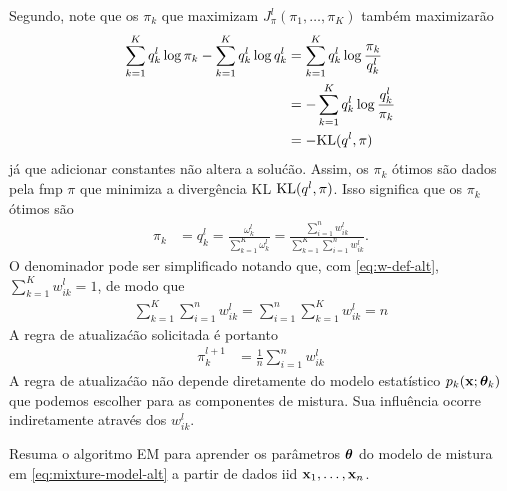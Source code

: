 \begin{exenumerate}
\begin{solution}
        Segundo, note que os $\pi_k$ que maximizam $J_\pi^l(\pi_1, \ldots,
        \pi_K)$ tamb\'em maximizar\~ao
        \begin{align}
            \sum_{k=1}^K q_k^l \log \pi_k - \sum_{k=1}^K q_k^l \log q_k^l & = \sum_{k=1}^K q_k^l \log \frac{\pi_k}{q_k^l}\\
            & = -\sum_{k=1}^K q_k^l \log \frac{q_k^l}{\pi_k}\\
            & = -\text{KL}(q^l, \pi)
        \end{align}
        j\'a que adicionar constantes n\~ao altera a solu\'c\~ao. Assim, os
        $\pi_k$ \'otimos s\~ao dados pela fmp $\pi$ que minimiza a diverg\^encia KL
        $\text{KL}(q^l, \pi)$. Isso significa que os $\pi_k$ \'otimos s\~ao
        \begin{align}
            \pi_k & = q_k^l= \frac{\omega_k^l}{\sum_{k=1}^K \omega_{k}^l} = \frac{\sum_{i=1}^n w_{ik}^l}{\sum_{k=1}^K \sum_{i=1}^n w_{ik}^l }.
        \end{align}
        O denominador pode ser simplificado notando que, com \eqref{eq:w-def-alt},
        $\sum_{k=1}^K w_{ik}^l=1$, de modo que
        \begin{align}
            \sum_{k=1}^K \sum_{i=1}^n w_{ik}^l = \sum_{i=1}^n \sum_{k=1}^K w_{ik}^l = n
        \end{align}   
        A regra de atualiza\'c\~ao solicitada \'e portanto
        \begin{align}
            \pi_k^{l+1} &=  \frac{1}{n}\sum_{i=1}^n w_{ik}^l
        \end{align}
        A regra de atualiza\'c\~ao n\~ao depende diretamente do modelo estat\'istico $p_k(\mathbf{x};
        \boldsymbol{\theta}_k)$ que podemos escolher para as componentes de mistura. Sua influ\^encia
        ocorre indiretamente atrav\'es dos $w_{ik}^l$.
    \end{solution}
    
    \item \label{ex:EM-mixture-models-summary-alt} Resuma o algoritmo EM para aprender os par\^ametros $\boldsymbol{\theta}$ do
    modelo de mistura em \eqref{eq:mixture-model-alt} a partir de dados iid $\mathbf{x}_1, \ldots, \mathbf{x}_n$.
    

\end{exenumerate}

